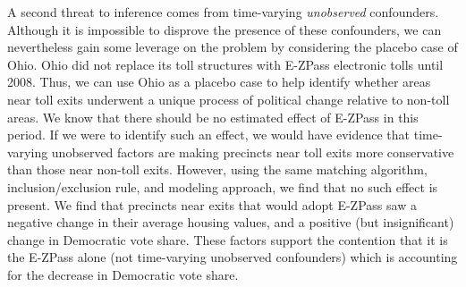 A second threat to inference comes from time-varying \emph{unobserved} confounders. Although it is impossible to disprove the presence of these confounders, we can nevertheless gain some leverage on the problem by considering the placebo case of Ohio. Ohio did not replace its toll structures with E-ZPass electronic tolls until 2008. Thus, we can use Ohio as a placebo case to help identify whether areas near toll exits underwent a unique process of political change relative to non-toll areas. We know that there should be no estimated effect of E-ZPass in this period. If we were to identify such an effect, we would have evidence that time-varying unobserved factors are making precincts near toll exits more conservative than those near non-toll exits. However, using the same matching algorithm, inclusion/exclusion rule, and modeling approach, we find that no such effect is present. We find that precincts near exits that would adopt E-ZPass saw a negative change in their average housing values, and a positive (but insignificant) change in Democratic vote share. These factors support the contention that it is the E-ZPass alone (not time-varying unobserved confounders) which is accounting for the decrease in Democratic vote share. 

\begin{table}[!bp] \centering 
{}
  \caption{Placebo analysis. Diff-in-diff results for change in average home price and Democratic vote share for Ohio.
          Matching/control variables include precinct-level covariates on average income, 
          percent of residents living in the same house as in 1995, percent of residents who are black, 
          percent of residents who are over the age of 65, percent of residents with a bachelor's degree. All matching/control data are from the US Census Bureau.}
  \label{placebo_voteshare_did} 
\end{table} 